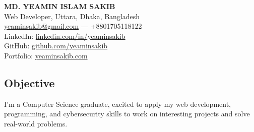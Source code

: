 \documentclass[a4paper,10pt]{article}
\begin{document}
\begin{center}
    \textbf{\huge MD. YEAMIN ISLAM SAKIB} \\[0.5em]
    Web Developer, Uttara, Dhaka, Bangladesh \\
    \href{mailto:yeaminsakib@gmail.com}{yeaminsakib@gmail.com} — +8801705118122 \\
    LinkedIn: \href{https://linkedin.com/in/yeaminsakib}{linkedin.com/in/yeaminsakib} \\ GitHub: \href{https://github.com/yeaminsakib}{github.com/yeaminsakib} \\
    Portfolio: \href{https://yeaminsakib.com}{yeaminsakib.com}
\end{center}

\begin{flushleft}
    \section*{Objective}
    I’m a Computer Science graduate, excited to apply my web development, programming, and cybersecurity skills to work on interesting projects and solve real-world problems.
\end{flushleft}
\end{document}
